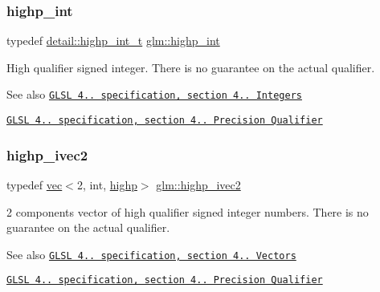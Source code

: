 \subsubsection{\texorpdfstring{highp\+\_\+int}{highp\_int}}
{\footnotesize\ttfamily typedef \hyperlink{namespaceglm_1_1detail_a74c48e9deafcc33db998a4ee62da8d6e}{detail\+::highp\+\_\+int\+\_\+t} \hyperlink{group__core__precision_gaafed5240eb0a43328cb75faf5fb0a8c2}{glm\+::highp\+\_\+int}}

High qualifier signed integer. There is no guarantee on the actual qualifier.

\begin{DoxySeeAlso}{See also}
\href{http://www.opengl.org/registry/doc/GLSLangSpec.4.20.8.pdf}{\tt G\+L\+SL 4.. specification, section 4.. Integers} 

\href{http://www.opengl.org/registry/doc/GLSLangSpec.4.20.8.pdf}{\tt G\+L\+SL 4.. specification, section 4.. Precision Qualifier} 
\end{DoxySeeAlso}
\mbox{\label{group__core__precision_gad2b0693752b92e6644be9f1c3e50a451}} 
\subsubsection{\texorpdfstring{highp\+\_\+ivec2}{highp\_ivec2}}
{\footnotesize\ttfamily typedef \hyperlink{structglm_1_1vec}{vec}$<$2, int, \hyperlink{namespaceglm_a36ed105b07c7746804d7fdc7cc90ff25ac6f7eab42eacbb10d59a58e95e362074}{highp}$>$ \hyperlink{group__core__precision_gad2b0693752b92e6644be9f1c3e50a451}{glm\+::highp\+\_\+ivec2}}

2 components vector of high qualifier signed integer numbers. There is no guarantee on the actual qualifier.

\begin{DoxySeeAlso}{See also}
\href{http://www.opengl.org/registry/doc/GLSLangSpec.4.20.8.pdf}{\tt G\+L\+SL 4.. specification, section 4.. Vectors} 

\href{http://www.opengl.org/registry/doc/GLSLangSpec.4.20.8.pdf}{\tt G\+L\+SL 4.. specification, section 4.. Precision Qualifier} 
\end{DoxySeeAlso}
\mbox{\label{group__core__precision_ga52ba3edf3183078cf4129e6193b32a2c}} 
